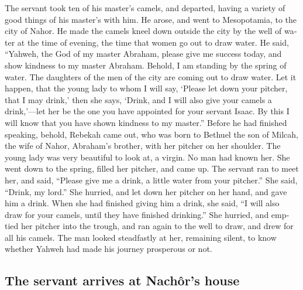 \begin{paracol}{2}
\begin{otherlanguage}{english}
 The servant took ten of his master's camels, and
departed, having a variety of good things of his master's with him. He
arose, and went to Mesopotamia, to the city of Nahor.  He
made the camels kneel down outside the city by the well of water at the
time of evening, the time that women go out to draw water.
 He said, ``Yahweh, the God of my master Abraham, please
give me success today, and show kindness to my master Abraham.
 Behold, I am standing by the spring of water. The
daughters of the men of the city are coming out to draw water.
 Let it happen, that the young lady to whom I will say,
`Please let down your pitcher, that I may drink,' then she says, `Drink,
and I will also give your camels a drink,'---let her be the one you have
appointed for your servant Isaac. By this I will know that you have
shown kindness to my master.''  Before he had finished
speaking, behold, Rebekah came out, who was born to Bethuel the son of
Milcah, the wife of Nahor, Abraham's brother, with her pitcher on her
shoulder.  The young lady was very beautiful to look at,
a virgin. No man had known her. She went down to the spring, filled her
pitcher, and came up.  The servant ran to meet her, and
said, ``Please give me a drink, a little water from your pitcher.''
 She said, ``Drink, my lord.'' She hurried, and let down
her pitcher on her hand, and gave him a drink.  When she
had finished giving him a drink, she said, ``I will also draw for your
camels, until they have finished drinking.''  She
hurried, and emptied her pitcher into the trough, and ran again to the
well to draw, and drew for all his camels.  The man
looked steadfastly at her, remaining silent, to know whether Yahweh had
made his journey prosperous or not.

\hypertarget{the-servant-arrives-at-nachuxf4rs-house}{%
\subsection{The servant arrives at Nachôr's
house}\label{the-servant-arrives-at-nachuxf4rs-house}}


\end{otherlanguage}
\end{paracol}
